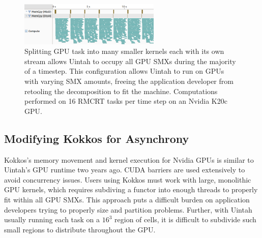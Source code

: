 \documentclass[12pt]{article}
\begin{document}
\begin{figure}
	\centering
	\includegraphics[width=0.60\textwidth]{figures/phaseiii-multistream-300rays-28x28x56_8threads_6streams_crop.png}
	\caption{Splitting GPU task into many smaller kernels each with its own stream allows Uintah to occupy all GPU SMXs during the majority of a timestep.  This configuration allows Uintah to run on GPUs with varying SMX amounts, freeing the application developer from retooling the decomposition to fit the machine.  Computations performed on 16 RMCRT tasks per time step on an Nvidia K20c GPU.   }
	\label{fig:rmcrt-distributing-tasks}
\end{figure}







\subsection{Modifying Kokkos for Asynchrony}
\label{ch:kokkos_modifications}
Kokkos’s memory movement and kernel execution for Nvidia GPUs is similar to Uintah’s GPU runtime two years ago.  CUDA barriers are used extensively to avoid concurrency issues.  Users using Kokkos must work with large, monolithic GPU kernels, which requires subdiving a functor into enough threads to properly fit within all GPU SMXs.  This approach puts a difficult burden on application developers trying to properly size and partition problems.  Further, with Uintah usually running each task on a $16^3$ region of cells, it is difficult to subdivide such small regions to distribute throughout the GPU.  
\end{document}

